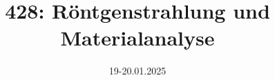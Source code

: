 

\title{428: Röntgenstrahlung und Materialanalyse}

\date{19-20.01.2025}





\maketitle










\printbibliography


